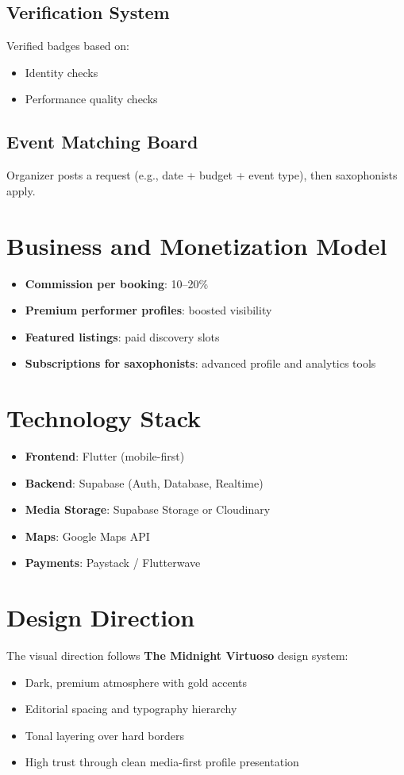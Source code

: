 \documentclass[11pt,a4paper]{article}
\begin{document}
\subsection{Verification System}
Verified badges based on:
\begin{itemize}[leftmargin=1.5em]
    \item Identity checks
    \item Performance quality checks
\end{itemize}

\subsection{Event Matching Board}
Organizer posts a request (e.g., date + budget + event type), then saxophonists apply.

\section{Business and Monetization Model}
\begin{itemize}[leftmargin=1.5em]
    \item \textbf{Commission per booking}: 10--20\%
    \item \textbf{Premium performer profiles}: boosted visibility
    \item \textbf{Featured listings}: paid discovery slots
    \item \textbf{Subscriptions for saxophonists}: advanced profile and analytics tools
\end{itemize}

\section{Technology Stack}
\begin{itemize}[leftmargin=1.5em]
    \item \textbf{Frontend}: Flutter (mobile-first)
    \item \textbf{Backend}: Supabase (Auth, Database, Realtime)
    \item \textbf{Media Storage}: Supabase Storage or Cloudinary
    \item \textbf{Maps}: Google Maps API
    \item \textbf{Payments}: Paystack / Flutterwave
\end{itemize}

\section{Design Direction}
The visual direction follows \textbf{The Midnight Virtuoso} design system:
\begin{itemize}[leftmargin=1.5em]
    \item Dark, premium atmosphere with gold accents
    \item Editorial spacing and typography hierarchy
    \item Tonal layering over hard borders
    \item High trust through clean media-first profile presentation
\end{itemize}
\end{document}
